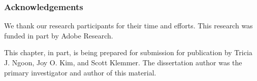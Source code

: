 \subsubsection{Acknowledgements}
We thank our research participants for their time and efforts. This research was funded in part by Adobe Research.

This chapter, in part, is being prepared for submission for publication by Tricia J. Ngoon, Joy O. Kim, and Scott Klemmer. The dissertation author was the primary investigator and author of this material.